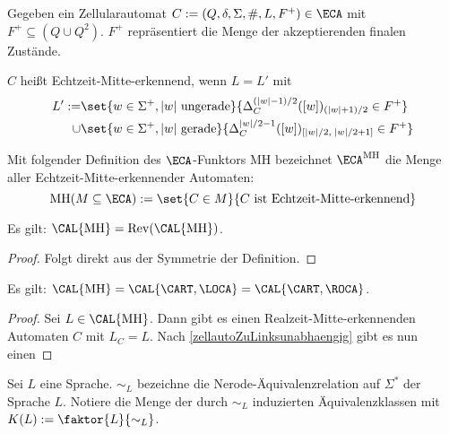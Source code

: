 

\newcommand{\CAMH}{\textrm{MH}}

\begin{definition}
    Gegeben ein Zellularautomat $C := (Q, \delta, \Sigma, \#, L, F^+) \in \ECA$
    mit $F^+ \subseteq (Q \cup Q^2)$.
    $F^+$ repräsentiert die Menge der akzeptierenden finalen Zustände.
    
    $C$ heißt Echtzeit-Mitte-erkennend, wenn $L = L'$ mit
    \begin{align*}
        L' := & \set{ w \in \Sigma^+, |w| \textrm{ ungerade} }{ \Delta_C^{(|w| - 1) / 2}([w])_{(|w| + 1) / 2} \in F^+ } \\
     \cup & \set{ w \in \Sigma^+, |w| \textrm{ gerade} }{ \Delta_C^{|w| / 2 - 1}([w])_{[|w| / 2, \; |w| / 2 + 1]} \in F^+ }
    \end{align*}
    
    Mit folgender Definition des $\ECA$-Funktors $\CAMH$ bezeichnet $\ECA^\CAMH$ die Menge aller Echtzeit-Mitte-erkennender Automaten:
    \[
        \CAMH(M \subseteq \ECA) := \set{ C \in M }{ C \text{ ist Echtzeit-Mitte-erkennend} }
    \]
\end{definition}



\begin{proposition}
    Es gilt: $\CAL{\CAMH} = \operatorname{Rev}(\CAL{\CAMH})$.
\end{proposition}
\begin{proof}
    Folgt direkt aus der Symmetrie der Definition.
\end{proof}

\begin{satz}
    Es gilt: $\CAL{\CAMH} = \CAL{\CART, \LOCA} = \CAL{\CART, \ROCA}$.
\end{satz}
\begin{proof}
    Sei $L \in \CAL{\CAMH}$. Dann gibt es einen Realzeit-Mitte-erkennenden Automaten $C$ mit $L_C = L$.
    Nach \cref{zellautoZuLinksunabhaengig} gibt es nun einen 
\end{proof}




\begin{definition}
    Sei $L$ eine Sprache. $\sim_L$ bezeichne die Nerode-Äquivalenzrelation auf $\Sigma^*$ der Sprache $L$.
    Notiere die Menge der durch $\sim_L$ induzierten Äquivalenzklassen mit $K(L) := \faktor{L}{\sim_L}$.
\end{definition}

